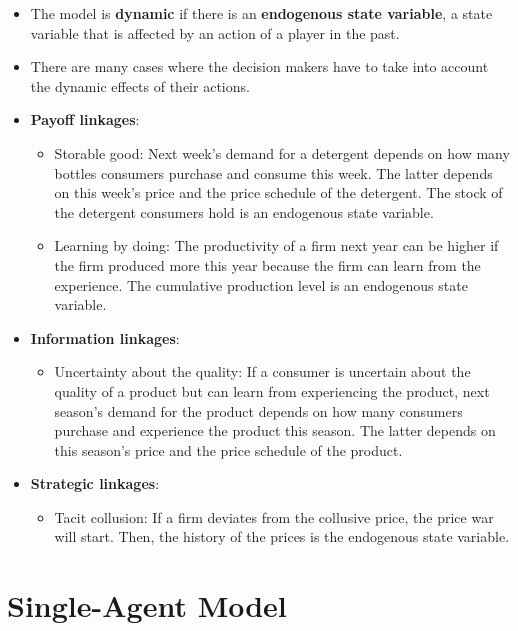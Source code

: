 \documentclass[
]{book}
\providecommand{\tightlist}{%
  \setlength{\itemsep}{0pt}\setlength{\parskip}{0pt}}
\begin{document}
\begin{itemize}
\tightlist
\item
  The model is \textbf{dynamic} if there is an \textbf{endogenous state variable}, a state variable that is affected by an action of a player in the past.
\item
  There are many cases where the decision makers have to take into account the dynamic effects of their actions.
\item
  \textbf{Payoff linkages}:

  \begin{itemize}
  \tightlist
  \item
    Storable good: Next week's demand for a detergent depends on how many bottles consumers purchase and consume this week. The latter depends on this week's price and the price schedule of the detergent. The stock of the detergent consumers hold is an endogenous state variable.
  \item
    Learning by doing: The productivity of a firm next year can be higher if the firm produced more this year because the firm can learn from the experience. The cumulative production level is an endogenous state variable.
  \end{itemize}
\item
  \textbf{Information linkages}:

  \begin{itemize}
  \tightlist
  \item
    Uncertainty about the quality: If a consumer is uncertain about the quality of a product but can learn from experiencing the product, next season's demand for the product depends on how many consumers purchase and experience the product this season. The latter depends on this season's price and the price schedule of the product.
  \end{itemize}
\item
  \textbf{Strategic linkages}:

  \begin{itemize}
  \tightlist
  \item
    Tacit collusion: If a firm deviates from the collusive price, the price war will start. Then, the history of the prices is the endogenous state variable.
  \end{itemize}
\end{itemize}

\hypertarget{single-agent-model}{%
\section{Single-Agent Model}\label{single-agent-model}}
\end{document}
